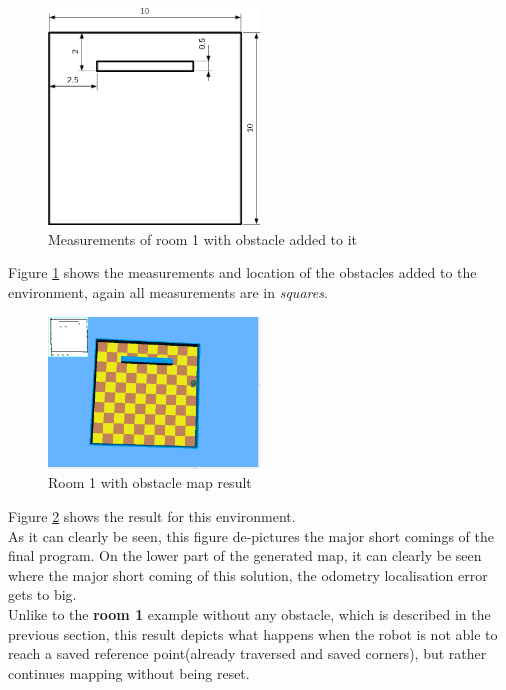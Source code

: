 \begin{figure}[h]
\centering
\includegraphics[width = 0.5\textwidth]{../../figures/room1_obstacle.png} 
\caption{Measurements of room 1 with obstacle added to it}
\label{room1_obstacle}
\end{figure}

Figure \ref{room1_obstacle} shows the measurements and location of the obstacles added to the environment, again all measurements are in \textit{squares}. 

\begin{figure}[h]
\centering
\includegraphics[width = 0.5\textwidth]{../../figures/map_results/one_obstacle_save_error.png} 
\caption{Room 1 with obstacle map result}
\label{room1_obstacle_result}
\end{figure}

Figure \ref{room1_obstacle_result} shows the result for this environment.\\
As it can clearly be seen, this figure de-pictures the major short comings of the final program. On the lower part of the generated map, it can clearly be seen where the major short coming of this solution, the odometry localisation error gets to big. \\
Unlike to the \textbf{room 1} example without any obstacle, which is described in the previous section, this result depicts what happens when the robot is not able to reach a saved reference point(already traversed and saved corners), but rather continues mapping without being reset. \\[3ex]

